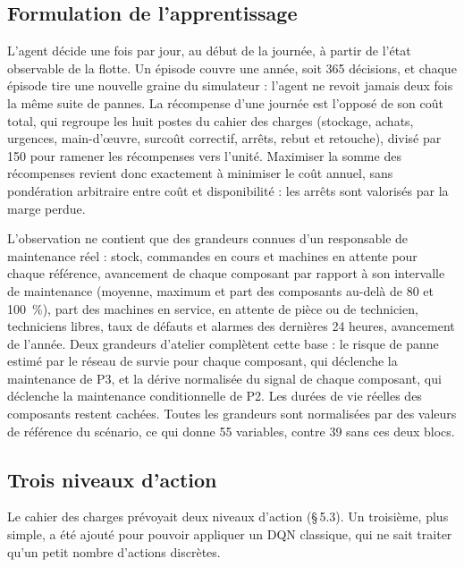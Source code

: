 \subsection{Formulation de l'apprentissage}\label{sec:rl}

L'agent décide une fois par jour, au début de la journée, à partir de l'état observable de la flotte. Un épisode couvre une année, soit 365 décisions, et chaque épisode tire une nouvelle graine du simulateur : l'agent ne revoit jamais deux fois la même suite de pannes. La récompense d'une journée est l'opposé de son coût total, qui regroupe les huit postes du cahier des charges (stockage, achats, urgences, main-d'œuvre, surcoût correctif, arrêts, rebut et retouche), divisé par 150 pour ramener les récompenses vers l'unité. Maximiser la somme des récompenses revient donc exactement à minimiser le coût annuel, sans pondération arbitraire entre coût et disponibilité : les arrêts sont valorisés par la marge perdue.

L'observation ne contient que des grandeurs connues d'un responsable de maintenance réel : stock, commandes en cours et machines en attente pour chaque référence, avancement de chaque composant par rapport à son intervalle de maintenance (moyenne, maximum et part des composants au-delà de 80 et 100~\%), part des machines en service, en attente de pièce ou de technicien, techniciens libres, taux de défauts et alarmes des dernières 24 heures, avancement de l'année. Deux grandeurs d'atelier complètent cette base : le risque de panne estimé par le réseau de survie pour chaque composant, qui déclenche la maintenance de P3, et la dérive normalisée du signal de chaque composant, qui déclenche la maintenance conditionnelle de P2. Les durées de vie réelles des composants restent cachées. Toutes les grandeurs sont normalisées par des valeurs de référence du scénario, ce qui donne 55 variables, contre 39 sans ces deux blocs.

\subsection{Trois niveaux d'action}

Le cahier des charges prévoyait deux niveaux d'action (§\,5.3). Un troisième, plus simple, a été ajouté pour pouvoir appliquer un DQN classique, qui ne sait traiter qu'un petit nombre d'actions discrètes.

